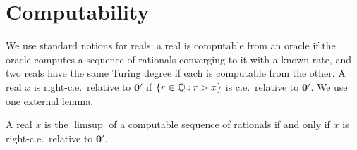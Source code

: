 \section{Computability}\label{sec:consequences}

We use standard notions for reals: a real is computable from an oracle if the oracle computes a sequence of rationals converging to it with a known rate, and two reals have the same Turing degree if each is computable from the other. A real $x$ is right-c.e.\ relative to $\mathbf 0'$ if $\{r\in\mathbb Q:r>x\}$ is c.e.\ relative to $\mathbf 0'$. We use one external lemma.

\begin{lemma}\label{lem:bbs}
A real $x$ is the $\limsup$ of a computable sequence of rationals if and only if $x$ is right-c.e.\ relative to $\mathbf 0'$.
\end{lemma}

